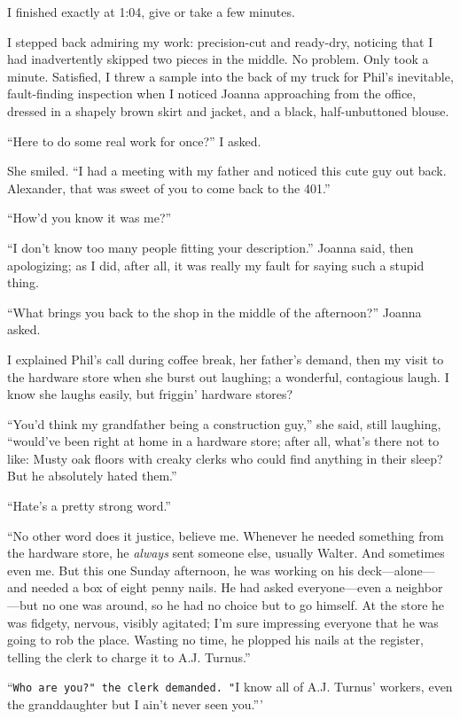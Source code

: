 I finished exactly at 1:04, give or take a few minutes.

I stepped back admiring my work: precision-cut and ready-dry, noticing
that I had inadvertently skipped two pieces in the middle. No problem.
Only took a minute. Satisfied, I threw a sample into the back of my
truck for Phil's inevitable, fault-finding inspection when I noticed
Joanna approaching from the office, dressed in a shapely brown skirt and
jacket, and a black, half-unbuttoned blouse.

``Here to do some real work for once?'' I asked.

She smiled. ``I had a meeting with my father and noticed this cute guy
out back. Alexander, that was sweet of you to come back to the 401.''

``How'd you know it was me?''

``I don't know too many people fitting your description.'' Joanna said,
then apologizing; as I did, after all, it was really my fault for saying
such a stupid thing.

``What brings you back to the shop in the middle of the afternoon?''
Joanna asked.

I explained Phil's call during coffee break, her father's demand, then
my visit to the hardware store when she burst out laughing; a wonderful,
contagious laugh. I know she laughs easily, but friggin' hardware
stores?

``You'd think my grandfather being a construction guy,'' she said, still
laughing, ``would've been right at home in a hardware store; after all,
what's there not to like: Musty oak floors with creaky clerks who could
find anything in their sleep? But he absolutely hated them.''

``Hate's a pretty strong word.''

``No other word does it justice, believe me. Whenever he needed
something from the hardware store, he \emph{always} sent someone else,
usually Walter. And sometimes even me. But this one Sunday afternoon, he
was working on his deck---alone---and needed a box of eight penny nails.
He had asked everyone---even a neighbor---but no one was around, so he
had no choice but to go himself. At the store he was fidgety, nervous,
visibly agitated; I'm sure impressing everyone that he was going to rob
the place. Wasting no time, he plopped his nails at the register,
telling the clerk to charge it to A.J. Turnus.''

``\texttt{Who\ are\ you?\textquotesingle{}"\ the\ clerk\ demanded.\ "}I
know all of A.J. Turnus' workers, even the granddaughter but I ain't
never seen you.'''

